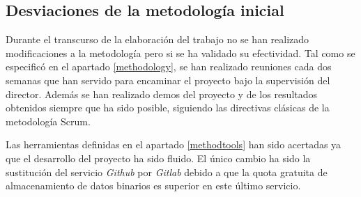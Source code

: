 \subsection{Desviaciones de la metodología inicial}\label{desvmethod}
Durante el transcurso de la elaboración del trabajo no se han realizado modificaciones a la metodología pero si se ha validado su efectividad.
Tal como se especificó en el apartado \ref{methodology}, se han realizado reuniones cada dos semanas que han servido para encaminar el proyecto bajo la supervisión del director. Además se han realizado demos del proyecto y de los resultados obtenidos siempre que ha sido posible, siguiendo las directivas clásicas de la metodología Scrum.

Las herramientas definidas en el apartado \ref{methodtools} han sido acertadas ya que el desarrollo del proyecto ha sido fluido. El único cambio ha sido la sustitución del servicio \textit{Github} por \textit{Gitlab} debido a que la quota gratuita de almacenamiento de datos binarios es superior en este último servicio.
